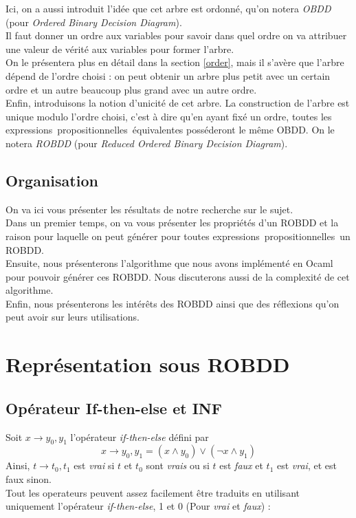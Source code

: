 \documentclass[a4paper, oneside]{report}
\newcommand{\expps}{expressions~propositionnelles~}
\begin{document}
Ici, on a aussi introduit l'idée que cet arbre est ordonné, qu'on notera \textit{OBDD} (pour \textit{Ordered Binary Decision Diagram}).\\
Il faut donner un ordre aux variables pour savoir dans quel ordre on va attribuer une valeur de vérité aux variables pour former l'arbre.\\
On le présentera plus en détail dans la section \ref{order}, mais il s'avère que l'arbre dépend de l'ordre choisi : on peut obtenir un arbre plus petit avec un certain ordre et un autre beaucoup plus grand avec un autre ordre.\\

Enfin, introduisons la notion d'unicité de cet arbre. La construction de l'arbre est unique modulo l'ordre choisi, c'est à dire qu'en ayant fixé un ordre, toutes les \expps équivalentes posséderont le même OBDD. On le notera \textit{ROBDD} (pour \textit{Reduced Ordered Binary Decision Diagram}).\\
 
\section*{Organisation}
On va ici vous présenter les résultats de notre recherche sur le sujet.\\
Dans un premier temps, on va vous présenter les propriétés d'un ROBDD et la raison pour laquelle on peut générer pour toutes \expps un ROBDD.\\
Ensuite, nous présenterons l'algorithme que nous avons implémenté en Ocaml pour pouvoir générer ces ROBDD. Nous discuterons aussi de la complexité de cet algorithme.\\
Enfin, nous présenterons les intérêts des ROBDD ainsi que des réflexions qu'on peut avoir sur leurs utilisations.  



\chapter{Représentation sous ROBDD}

\section{Opérateur If-then-else et INF}

Soit $ x \rightarrow y_0, y_1 $ l'opérateur \textit{if-then-else} défini par \\
$$ x \rightarrow y_0, y_1 = ( x \wedge y_0 ) \vee ( \neg x \wedge y_1 )$$
Ainsi, $ t \rightarrow t_0, t_1 $ est \textit{vrai} si $t$ et $t_0$ sont \textit{vrais} ou si $t$ est \textit{faux} et $t_1$ est \textit{vrai}, et est faux sinon.\\
Tout les operateurs peuvent assez facilement être traduits en utilisant uniquement l'opérateur \textit{if-then-else}, 1 et 0 (Pour \textit{vrai} et \textit{faux}) :\\
\end{document}
